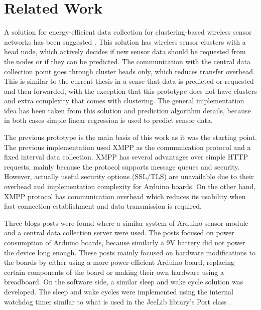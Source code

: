 

\chapter{Related Work} %

A solution for energy-efficient data collection for clustering-based wireless sensor networks has been suggested \cite{cluster_wsn_paper}. This solution has wireless sensor clusters with a head node, which actively decides if new sensor data should be requested from the nodes or if they can be predicted. The communication with the central data collection point goes through cluster heads only, which reduces transfer overhead. This is similar to the current thesis in a sense that data is predicted or requested and then forwarded, with the exception that this prototype does not have clusters and extra complexity that comes with clustering. 
The general implementation idea has been taken from this solution and prediction algorithm details, because in both cases simple linear regression is used to predict sensor data. 


The previous prototype \cite{prev_thesis} is the main basis of this work as it was the starting point. The previous implementation used XMPP as the communication protocol and a fixed interval data collection. XMPP has several advantages over simple HTTP requests, mainly because the protocol supports message queues and security. However, actually useful security options (SSL/TLS) are unavailable due to their overhead and implementation complexity for Arduino boards. On the other hand, XMPP protocol has communication overhead which reduces its usability when fast connection establishment and data transmission is required.

Three blogs posts were found  where a similar system of Arduino sensor module and a central data collection server were used. The posts focused on power consumption of Arduino boards, because similarly a 9V battery did not power the device long enough. These posts mainly focused on hardware modifications to the boards by either using a more power-efficient Arduino board,  replacing certain components of the board or making their own hardware using a breadboard. On the software side, a similar sleep and wake cycle solution was developed. The sleep and wake cycles were implemented using the internal watchdog timer similar to what is used in the JeeLib library's Port class \cite{jeelib_port}.



